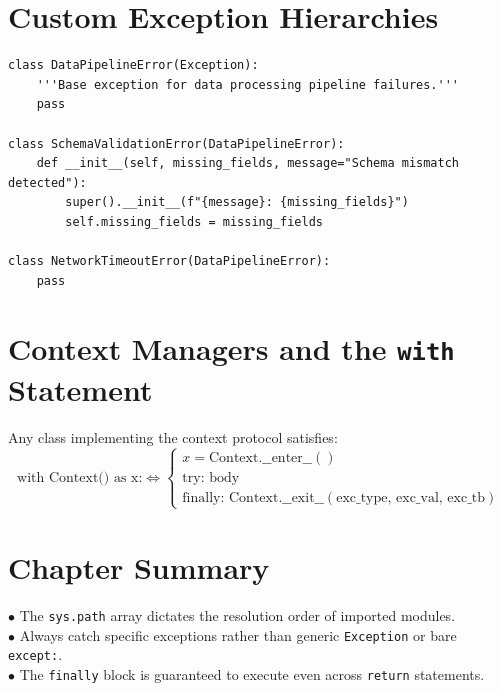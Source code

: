 \section{Custom Exception Hierarchies}
\begin{lstlisting}
class DataPipelineError(Exception):
    '''Base exception for data processing pipeline failures.'''
    pass

class SchemaValidationError(DataPipelineError):
    def __init__(self, missing_fields, message="Schema mismatch detected"):
        super().__init__(f"{message}: {missing_fields}")
        self.missing_fields = missing_fields

class NetworkTimeoutError(DataPipelineError):
    pass
\end{lstlisting}

\section{Context Managers and the \texttt{with} Statement}
\begin{keyequation}
Any class implementing the context protocol satisfies:
\begin{equation}
\text{with Context() as x:} \iff \begin{cases}
x = \text{Context}.\_\_\text{enter}\_\_() \\
\text{try: body} \\
\text{finally: Context}.\_\_\text{exit}\_\_(\text{exc\_type, exc\_val, exc\_tb})
\end{cases}
\end{equation}
\end{keyequation}

\section{Chapter Summary}
\begin{summarybox}
$\bullet$ The \texttt{sys.path} array dictates the resolution order of imported modules.\\
$\bullet$ Always catch specific exceptions rather than generic \texttt{Exception} or bare \texttt{except:}.\\
$\bullet$ The \texttt{finally} block is guaranteed to execute even across \texttt{return} statements.
\end{summarybox}
